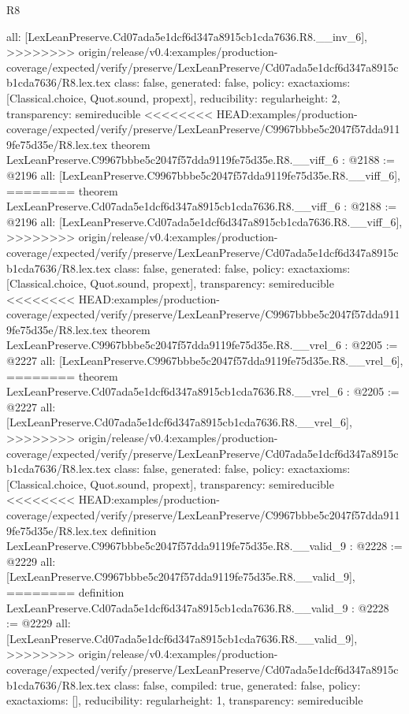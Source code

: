 \begin{lexlean}{R8}
\begin{coremodule}
{{{{{{{{{{{{  all: [LexLeanPreserve.Cd07ada5e1dcf6d347a8915cb1cda7636.R8.__inv_6],
>>>>>>>> origin/release/v0.4:examples/production-coverage/expected/verify/preserve/LexLeanPreserve/Cd07ada5e1dcf6d347a8915cb1cda7636/R8.lex.tex
  class: false,
  generated: false,
  policy: exact{axioms: [Classical.choice, Quot.sound, propext]},
  reducibility: regular{height: 2},
  transparency: semireducible
}
<<<<<<<< HEAD:examples/production-coverage/expected/verify/preserve/LexLeanPreserve/C9967bbbe5c2047f57dda9119fe75d35e/R8.lex.tex
theorem LexLeanPreserve.C9967bbbe5c2047f57dda9119fe75d35e.R8.__viff_6 : @2188 := @2196 {
  all: [LexLeanPreserve.C9967bbbe5c2047f57dda9119fe75d35e.R8.__viff_6],
========
theorem LexLeanPreserve.Cd07ada5e1dcf6d347a8915cb1cda7636.R8.__viff_6 : @2188 := @2196 {
  all: [LexLeanPreserve.Cd07ada5e1dcf6d347a8915cb1cda7636.R8.__viff_6],
>>>>>>>> origin/release/v0.4:examples/production-coverage/expected/verify/preserve/LexLeanPreserve/Cd07ada5e1dcf6d347a8915cb1cda7636/R8.lex.tex
  class: false,
  generated: false,
  policy: exact{axioms: [Classical.choice, Quot.sound, propext]},
  transparency: semireducible
}
<<<<<<<< HEAD:examples/production-coverage/expected/verify/preserve/LexLeanPreserve/C9967bbbe5c2047f57dda9119fe75d35e/R8.lex.tex
theorem LexLeanPreserve.C9967bbbe5c2047f57dda9119fe75d35e.R8.__vrel_6 : @2205 := @2227 {
  all: [LexLeanPreserve.C9967bbbe5c2047f57dda9119fe75d35e.R8.__vrel_6],
========
theorem LexLeanPreserve.Cd07ada5e1dcf6d347a8915cb1cda7636.R8.__vrel_6 : @2205 := @2227 {
  all: [LexLeanPreserve.Cd07ada5e1dcf6d347a8915cb1cda7636.R8.__vrel_6],
>>>>>>>> origin/release/v0.4:examples/production-coverage/expected/verify/preserve/LexLeanPreserve/Cd07ada5e1dcf6d347a8915cb1cda7636/R8.lex.tex
  class: false,
  generated: false,
  policy: exact{axioms: [Classical.choice, Quot.sound, propext]},
  transparency: semireducible
}
<<<<<<<< HEAD:examples/production-coverage/expected/verify/preserve/LexLeanPreserve/C9967bbbe5c2047f57dda9119fe75d35e/R8.lex.tex
definition LexLeanPreserve.C9967bbbe5c2047f57dda9119fe75d35e.R8.__valid_9 : @2228 := @2229 {
  all: [LexLeanPreserve.C9967bbbe5c2047f57dda9119fe75d35e.R8.__valid_9],
========
definition LexLeanPreserve.Cd07ada5e1dcf6d347a8915cb1cda7636.R8.__valid_9 : @2228 := @2229 {
  all: [LexLeanPreserve.Cd07ada5e1dcf6d347a8915cb1cda7636.R8.__valid_9],
>>>>>>>> origin/release/v0.4:examples/production-coverage/expected/verify/preserve/LexLeanPreserve/Cd07ada5e1dcf6d347a8915cb1cda7636/R8.lex.tex
  class: false,
  compiled: true,
  generated: false,
  policy: exact{axioms: []},
  reducibility: regular{height: 1},
  transparency: semireducible
}}}}}}}}}}}}}}}
\end{coremodule}
\end{lexlean}
